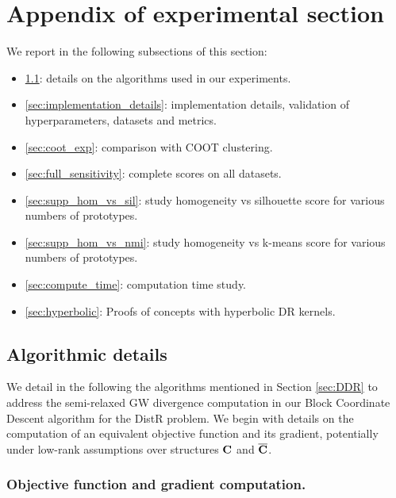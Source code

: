 \section{Appendix of experimental section}\label{sec:appendix_exps}

We report in the following subsections of this section:
\begin{itemize}
	\item \ref{sec:algorithms}: details on the algorithms used in our experiments.
	\item \ref{sec:implementation_details}: implementation details, validation of hyperparameters, datasets and metrics.
	\item \ref{sec:coot_exp}: comparison with COOT clustering.
	\item \ref{sec:full_sensitivity}: complete scores on all datasets.
	\item \ref{sec:supp_hom_vs_sil}: study homogeneity vs silhouette score for various numbers of prototypes.
	\item \ref{sec:supp_hom_vs_nmi}: study homogeneity vs k-means score for various numbers of prototypes.
	\item \ref{sec:compute_time}: computation time study.
	\item \ref{sec:hyperbolic}: Proofs of concepts with hyperbolic DR kernels.
\end{itemize}


\subsection{Algorithmic details}\label{sec:algorithms}

We detail in the following the algorithms mentioned in Section \ref{sec:DDR} to address the semi-relaxed GW divergence computation in our Block Coordinate Descent algorithm for the DistR problem. We begin with details on the computation of an equivalent objective function and its gradient, potentially under low-rank assumptions over structures ${\mathbf{C}}$ and $\overline{{\mathbf{C}}}$.

\subsubsection{Objective function and gradient computation.}\label{subsec:GWloss} 


